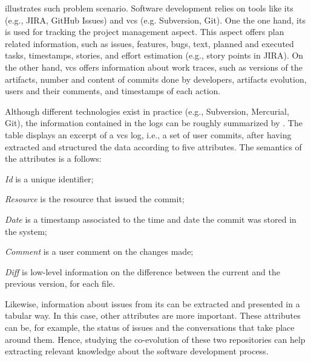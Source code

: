 \documentclass[a4paper,11pt]{article}
\begin{document}
 illustrates such problem scenario. Software development relies on tools like \gls{its} (e.g., JIRA, GitHub Issues) and \gls{vcs} (e.g. Subversion, Git). One the one hand, \gls{its} is used for tracking the project management aspect. This aspect offers plan related information, such as issues, features, bugs, text, planned and executed tasks, timestamps, stories, and effort estimation (e.g., story points in JIRA).
On the other hand, \gls{vcs} offers information about work traces, such as versions of the artifacts, number and content of commits done by developers, artifacts evolution, users and their comments, and timestamps of each action. 


Although different technologies exist in practice (e.g., Subversion, Mercurial, Git), the information contained in the logs can be roughly summarized by . The table displays an excerpt of a \gls{vcs} log, i.e., a set of user commits, after having extracted and structured the data according to five attributes. The semantics of the  attributes is a follows: 
\begin{inparaenum}[\itshape i)]
	\item \emph{Id} is a unique identifier;
	\item \emph{Resource} is the resource that issued the commit;
	\item \emph{Date} is a timestamp associated to the time and date the commit was stored in the system;
	\item \emph{Comment} is a user comment on the changes made;
	\item \emph{Diff} is low-level information on the difference between the current and the previous version, for each file.
\end{inparaenum} 
Likewise, information about issues from \gls{its} can be extracted and presented in a tabular way. In this case, other attributes are more important. These attributes can be, for example, the status of issues and the conversations that take place around them. %
Hence, studying the co-evolution of these two repositories can help extracting relevant knowledge about the software development process. 
\end{document}
